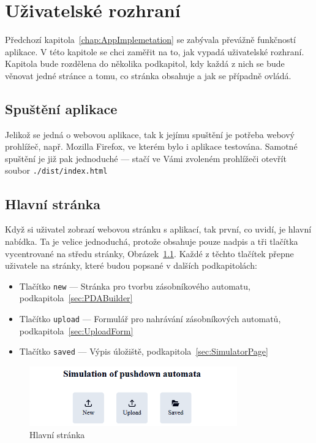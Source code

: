 \chapter{Uživatelské rozhraní}\label{chap:UI}

Předchozí kapitola~\ref{chap:AppImplemetation} se zabývala převážně funkčností aplikace. V této kapitole se chci zaměřit na to, jak vypadá uživatelské rozhraní. Kapitola bude rozdělena do několika podkapitol, kdy každá z nich se bude věnovat jedné stránce a tomu, co stránka obsahuje a jak se případně ovládá. 

\section{Spuštění aplikace}

Jelikož se jedná o webovou aplikace, tak k jejímu spuštění je potřeba webový prohlížeč, např. Mozilla Firefox, ve kterém bylo i aplikace testována. Samotné spuštění je již pak jednoduché --- stačí ve Vámi zvoleném prohlížeči otevřít soubor \texttt{./dist/index.html}

\section{Hlavní stránka}

Když si uživatel zobrazí webovou stránku s aplikací, tak první, co uvidí, je hlavní nabídka. Ta je velice jednoduchá, protože obsahuje pouze nadpis a tři tlačítka vycentrované na středu stránky, Obrázek~\ref{fig:UIMainPage}. Každé z těchto tlačítek přepne uživatele na stránky, které budou popsané v dalších podkapitolách:
\begin{itemize}
    \item Tlačítko \texttt{new} --- Stránka pro tvorbu zásobníkového automatu, podkapitola~\ref{sec:PDABuilder}
    \item Tlačítko \texttt{upload} --- Formulář pro nahrávání zásobníkových automatů, podkapitola~\ref{sec:UploadForm}
    \item Tlačítko \texttt{saved} --- Výpis úložiště, podkapitola~\ref{sec:SimulatorPage}
\end{itemize}

\begin{figure}[h]
    \centering
    \includegraphics[width=0.8\textwidth]{Figures/PrntScrn_UI_MainMenu.png}
    \caption{Hlavní stránka}\label{fig:UIMainPage}
\end{figure}

